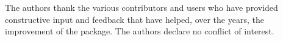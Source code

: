 \documentclass[journal=jacsat,manuscript=article]{achemso}\usepackage[]{graphicx}\usepackage[]{color}
\begin{document}
\begin{acknowledgement}

The authors thank the various contributors and users who have provided
constructive input and feedback that have helped, over the years, the
improvement of the package. The authors declare no conflict of
interest.

\end{acknowledgement}




\end{document}
